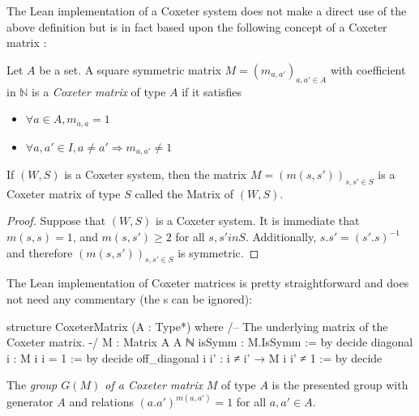 The Lean implementation  of a Coxeter system does not make a direct use of the above definition but is in fact based upon the following concept of a Coxeter matrix :

\begin{definition}
    Let $A$ be a set. A square symmetric matrix $M = \left( m_{a,a'}\right)_{a,a' \in A}$ with coefficient in $\mathbb{N}$ is a \emph{Coxeter matrix} of type $A$ if it satisfies 
\begin{itemize}
    \item $\forall  a \in A, m_{a,a} = 1$
    \item $\forall a,a' \in  I, a \neq  a' \Rightarrow m_{a,a'} \neq 1$
\end{itemize}
 
    If $\left( W,S \right)$ is a Coxeter system, then the matrix $M = \left( m\left( s,s' \right) \right)_{s,s' \in  S}$ is a Coxeter matrix of type $S$ called the Matrix of $\left( W,S \right)$.
\end{definition}

\begin{proof}
    Suppose that $\left( W,S \right)$ is a Coxeter system. It is immediate that $m\left( s,s \right) = 1$, and $m(s,s') \ge  2$ for all $s,s' in S$. Additionally, $s.s' = (s'.s)^{-1}$ and therefore $\left( m\left( s,s' \right) \right)_{s,s' \in  S}$ is symmetric.
\end{proof}

The Lean implementation of Coxeter matrices is pretty straightforward and does not need any commentary (the s can be ignored):
\begin{leancode}
structure CoxeterMatrix (A : Type*) where
  /-- The underlying matrix of the Coxeter matrix. -/
  M : Matrix A A ℕ
  isSymm : M.IsSymm := by decide
  diagonal i : M i i = 1 := by decide
  off_diagonal i i' : i ≠ i' → M i i' ≠ 1 := by decide
\end{leancode}

\begin{definition}
    The \emph{group  $G(M)$ of a Coxeter matrix} $M$ of type $A$ is the presented group with generator $A$ and relations $(a.a')^{m\left( a,a' \right)} = 1$ for all $a,a' \in A$. 
\end{definition}

